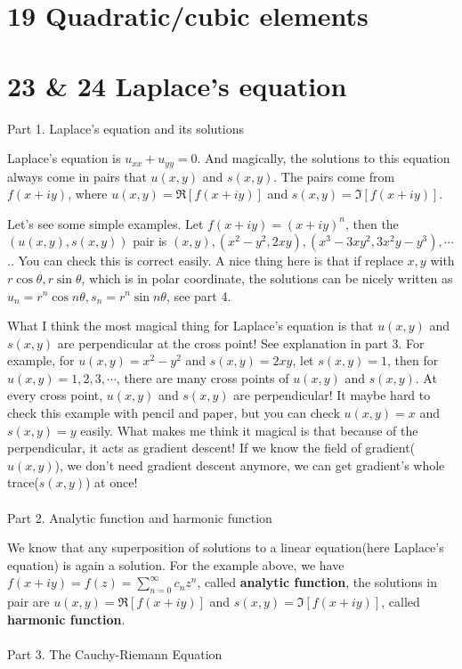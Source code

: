 \documentclass{article}
\begin{document}
\begin{spacing}{1.5}
\section*{19 Quadratic/cubic elements}


\section*{23 \& 24 Laplace's equation}
Part 1. Laplace's equation and its solutions

Laplace's equation is {\bfseries $u_{xx}+u_{yy}=0$}. And magically, the solutions to this equation always come in pairs that $u(x, y)$ and $s(x,  y)$. The pairs come from $f(x+iy)$, where $u(x,y)=\Re[f(x+iy)]$ and $s(x,y)=\Im[f(x+iy)]$. 

Let's see some simple examples. Let $f(x+iy)=(x+iy)^n$, then the $(u(x,y), s(x,y))$ pair is  $(x, y), (x^2-y^2, 2xy), (x^3-3xy^2, 3x^2y-y^3), \cdots$.. You can check this is correct easily. A nice thing here is that if replace $x, y$ with $r\cos \theta, r\sin \theta$, which is in polar coordinate, the solutions can be nicely written as $u_n=r^n\cos n\theta, s_n=r^n\sin n\theta$, see part 4.

What I think the most magical thing for Laplace's equation is that $u(x,y)$ and $s(x, y)$ are perpendicular at the cross point! See explanation in part 3. For example, for $u(x,y)=x^2 - y^2$ and $s(x,y)=2xy$, let $s(x, y)=1$, then for $u(x,y)=1, 2, 3, \cdots$, there are many cross points of $u(x,y)$ and $s(x,y)$. At every cross point, $u(x,y)$ and $s(x, y)$ are perpendicular! It maybe hard to check this example with pencil and paper, but you can check $u(x,y)=x$ and $s(x,y)=y$ easily. What makes me think it magical is that because of the perpendicular, it acts as gradient descent! If we know the field of gradient($u(x,y)$), we don't need gradient descent anymore, we can get gradient's whole trace($s(x, y)$) at once!
\\\\Part 2. Analytic function and harmonic function

We know that any superposition of solutions to a linear equation(here Laplace's equation) is again a solution. For the example above, we have $f(x+iy)=f(z)=\sum_{n=0}^{\infty}c_nz^n$, called {\bfseries analytic function}, the solutions in pair are $u(x, y) = \Re[f(x+iy)]$ and $s(x, y) = \Im[f(x+iy)]$, called {\bfseries harmonic function}.
\\\\Part 3. The Cauchy-Riemann Equation


\end{spacing}
\end{document}
